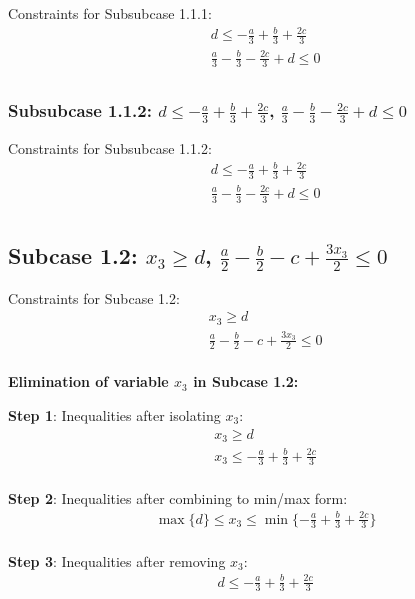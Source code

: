\documentclass{article}
\begin{document}
Constraints for Subsubcase 1.1.1:
\begin{align}
& d \leq - \frac{a}{3} + \frac{b}{3} + \frac{2 c}{3} \\
& \frac{a}{3} - \frac{b}{3} - \frac{2 c}{3} + d \leq 0 \\
\end{align}

\subsubsection{Subsubcase 1.1.2: $d \leq - \frac{a}{3} + \frac{b}{3} + \frac{2 c}{3}$, $\frac{a}{3} - \frac{b}{3} - \frac{2 c}{3} + d \leq 0$}

Constraints for Subsubcase 1.1.2:
\begin{align}
& d \leq - \frac{a}{3} + \frac{b}{3} + \frac{2 c}{3} \\
& \frac{a}{3} - \frac{b}{3} - \frac{2 c}{3} + d \leq 0 \\
\end{align}

\subsection{Subcase 1.2: $x_{3} \geq d$, $\frac{a}{2} - \frac{b}{2} - c + \frac{3 x_{3}}{2} \leq 0$}

Constraints for Subcase 1.2:
\begin{align}
& x_{3} \geq d \\
& \frac{a}{2} - \frac{b}{2} - c + \frac{3 x_{3}}{2} \leq 0 \\
\end{align}

\textbf{Elimination of variable $x_{3}$ in Subcase 1.2:}

\textbf{Step 1}: Inequalities after isolating $x_{3}$:
\begin{align}
& x_{3} \geq d \\
& x_{3} \leq - \frac{a}{3} + \frac{b}{3} + \frac{2 c}{3} \\
\end{align}

\textbf{Step 2}: Inequalities after combining to min/max form:
\begin{align}
& \max\{d\} \leq x_{3} \leq \min\{- \frac{a}{3} + \frac{b}{3} + \frac{2 c}{3}\} \\
\end{align}

\textbf{Step 3}: Inequalities after removing $x_{3}$:
\begin{align}
& d \leq - \frac{a}{3} + \frac{b}{3} + \frac{2 c}{3} \\
\end{align}
\end{document}
